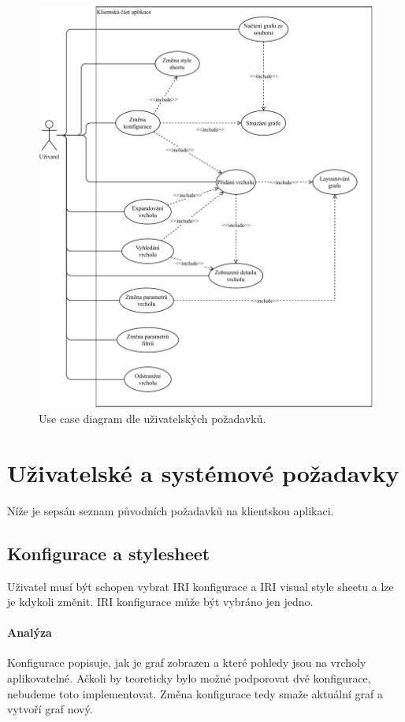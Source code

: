 \begin{figure}
    \centering
    \includegraphics[width=\textwidth]{media/use-case.pdf}
    \caption{Use case diagram dle uživatelských požadavků.}
    \label{fig:use-case}
\end{figure}

\section{Uživatelské a systémové požadavky}\label{pozadavky-uzivatelske}

Níže je sepsán seznam původních požadavků na klientskou aplikaci.

\subsection*{Konfigurace a stylesheet}
Uživatel musí být schopen vybrat IRI konfigurace a IRI visual style sheetu a lze je kdykoli změnit. IRI konfigurace může být vybráno jen jedno.

\paragraph{Analýza} Konfigurace popisuje, jak je graf zobrazen a které pohledy jsou na vrcholy aplikovatelné. Ačkoli by teoreticky bylo možné podporovat dvě konfigurace, nebudeme toto implementovat. Změna konfigurace tedy smaže aktuální graf a vytvoří graf nový.

